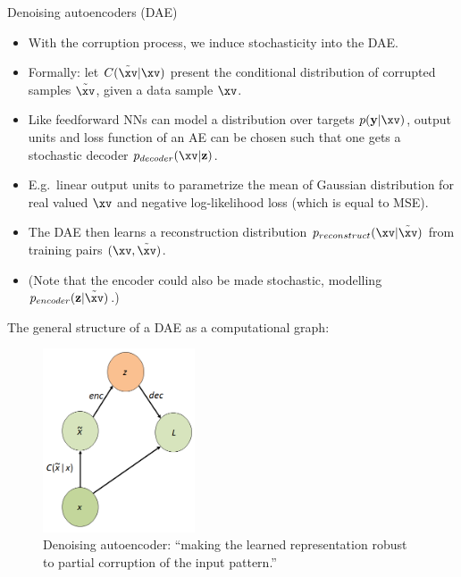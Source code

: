 \begin{vbframe}{Denoising autoencoders (DAE)}
  \begin{itemize}
    \item %
    With the  corruption process, we induce stochasticity  into the DAE.
    \item Formally: let $C(\tilde{\xv}|\xv)$ present the conditional distribution of corrupted samples $\tilde{\xv}$, given a data sample $\xv$.
    \item  Like feedforward NNs can model a distribution over targets $p(\mathbf{y}|\xv)$, output units and loss function of an AE can be chosen such that one gets a stochastic decoder $p_{decoder}(\xv|\mathbf{z})$.
    \item E.g.~linear output units to parametrize the mean of Gaussian distribution for real valued $\xv$ and negative log-likelihood loss (which is equal to MSE).
    \item The DAE then learns a  reconstruction distribution $p_{reconstruct}(\xv|\tilde{\xv})$ from training pairs $(\xv, \tilde{\xv})$.
  \item (Note that the encoder could also be made stochastic, modelling $p_{encoder}(\mathbf{z}|\tilde{\xv})$.)
  \end{itemize}
\framebreak
  The general structure of a DAE as a computational graph:
  \begin{figure}
    \centering
    \includegraphics[width=4.5cm]{plots/denoising_autoencoder_basic_structure.png}
    \caption{Denoising autoencoder: \enquote{making the learned representation
robust to partial corruption of the input pattern.}}
  \end{figure}
\framebreak
  \begin{algorithm}[H]

\end{algorithm}
\end{vbframe}
